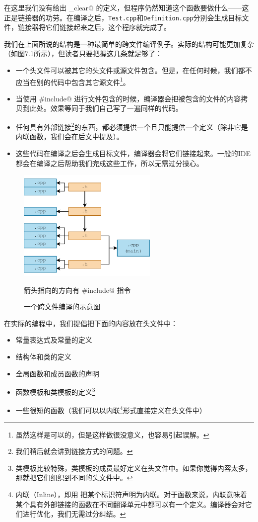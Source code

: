 在这里我们没有给出 \lstinline@input_clear@ 的定义，但程序仍然知道这个函数要做什么——这正是链接器的功劳。在编译之后，\texttt{Test.cpp}和\texttt{Definition.cpp}分别会生成目标文件，链接器将它们链接起来之后，这个程序就完成了。\par
我们在上面所说的结构是一种最简单的跨文件编译例子。实际的结构可能更加复杂（如图7.1所示），但读者只要把握这几条就足够了：
\begin{itemize}
    \item 一个头文件可以被其它的头文件或源文件包含。但是，在任何时候，我们都不应当在别的代码中包含其它源文件\footnote{虽然这样是可以的，但是这样做很没意义，也容易引起误解。}。
    \item 当使用 \lstinline@#include@ 进行文件包含的时候，编译器会把被包含的文件的内容拷贝到此处。效果等同于我们自己写了一遍同样的代码。
    \item 任何具有外部链接\footnote{我们稍后就会讲到链接方式的问题。}的东西，都必须提供一个且只能提供一个定义（除非它是内联函数，我们会在后文中提及）。
    \item 这些代码在编译之后会生成目标文件，编译器会将它们链接起来。一般的IDE都会在编译之后帮助我们完成这些工作，所以无需过分操心。
\end{itemize}
\begin{figure}[htbp]
    \centering
    \includegraphics[width=0.6\textwidth]{../images/generalized_parts/07_separate_compilation_300.png}
    \caption{一个跨文件编译的示意图}
    \footnotesize{箭头指向的方向有 \lstinline@#include@ 指令}
\end{figure}
在实际的编程中，我们提倡把下面的内容放在头文件中：
\begin{itemize}
    \item 常量表达式及常量的定义
    \item 结构体和类的定义
    \item 全局函数和成员函数的声明
    \item 函数模板和类模板的定义\footnote{类模板比较特殊，类模板的成员最好定义在头文件中。如果你觉得内容太多，那就把它们组织到不同的头文件中。}
    \item 一些很短的函数（我们可以以内联\footnote{内联（Inline），即用 \lstinline@inline@ 把某个标识符声明为内联。对于函数来说，内联意味着某个具有外部链接的函数在不同翻译单元中都可以有一个定义。编译器会对它们进行优化，我们无需过分纠结。}形式直接定义在头文件中）
\end{itemize}

